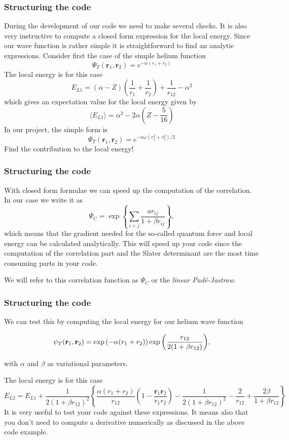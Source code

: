 \documentclass[compress]{beamer}
\begin{document}
\frame
{
  \frametitle{Structuring the code}
\begin{small}
{\scriptsize
During the development of our code we need to make several checks. It is also very instructive to compute a closed form expression for the local energy. Since our wave function is rather simple  it is straightforward
to find an analytic expressions.  Consider first the case of the simple helium function 
\[
   \Psi_T(\mathbf{r}_1,\mathbf{r}_2) = e^{-\alpha(r_1+r_2)}
\]
The local energy is for this case 
\[ 
E_{L1} = \left(\alpha-Z\right)\left(\frac{1}{r_1}+\frac{1}{r_2}\right)+\frac{1}{r_{12}}-\alpha^2
\]
which gives an expectation value for the local energy given by
\[
\langle E_{L1} \rangle = \alpha^2-2\alpha\left(Z-\frac{5}{16}\right)
\]
In our project, the simple form is
\[
   \Psi_T(\mathbf{r}_1,\mathbf{r}_2) = e^{-\alpha\omega(r_1^2+r_2^2)/2}
\]
Find the contribution to the local energy!
}
\end{small}
}

\frame
{
  \frametitle{Structuring the code}
\begin{small}
{\scriptsize
With closed form formulae we  can speed up the computation of the correlation. In our case
we write it as 
\[
\Psi_C= \exp{\left\{\sum_{i<j}\frac{ar_{ij}}{1+\beta r_{ij}}\right\}},
\]
which means that the gradient needed for the so-called quantum force and local energy 
can be calculated analytically.
This will speed up your code since the computation of the correlation part and the Slater determinant are the most 
time consuming parts in your code.  

We will refer to this correlation function as $\Psi_C$ or the \emph{linear Pad\'e-Jastrow}.

}
\end{small}
}

\frame
{
  \frametitle{Structuring the code}
\begin{small}
{\scriptsize
We can test this by computing the local energy for our helium wave function

\[
   \psi_{T}({\bf r}_1,{\bf r}_2) = 
   \exp{\left(-\alpha(r_1+r_2)\right)}
   \exp{\left(\frac{r_{12}}{2(1+\beta r_{12})}\right)}, 
\]

with $\alpha$ and $\beta$ as variational parameters.

The local energy is for this case 
\[ 
E_{L2} = E_{L1}+\frac{1}{2(1+\beta r_{12})^2}\left\{\frac{\alpha(r_1+r_2)}{r_{12}}(1-\frac{\mathbf{r}_1\mathbf{r}_2}{r_1r_2})-\frac{1}{2(1+\beta r_{12})^2}-\frac{2}{r_{12}}+\frac{2\beta}{1+\beta r_{12}}\right\}
\]
It is very useful to test your code against these expressions. It means also that you don't need to
compute a derivative numerically as discussed in the above code example. 
}
\end{small}
}
\end{document}
